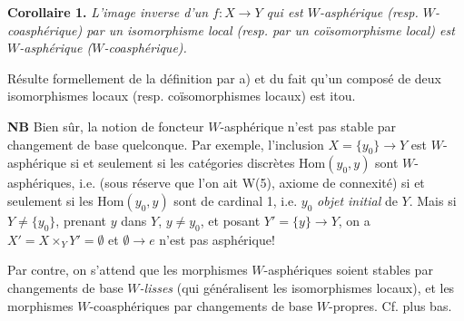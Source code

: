 \begin{center}
\end{center}

\textbf{Corollaire 1.} \textit{L'image inverse d'un $f : X \longrightarrow Y$ qui est $W$-asphérique (resp. $W$-coasphérique) par un isomorphisme local (resp. par un coïsomorphisme local) est $W$-asphérique ($W$-coasphérique).}

\begin{center}
\end{center}

Résulte formellement de la définition par a) et du fait qu'un composé de deux isomorphismes locaux (resp. coïsomorphismes locaux) est itou.

\textbf{NB} Bien sûr, la notion de foncteur $W$-asphérique n'est pas stable par changement de base quelconque. Par exemple, l'inclusion $X = \{y_0\} \longrightarrow Y$ est $W$-asphérique si et seulement si les catégories discrètes $\mathrm{Hom}(y_0, y)$ sont $W$-asphériques, i.e. (sous réserve que l'on ait W(5), axiome de connexité) si et seulement si les $\mathrm{Hom}(y_0, y)$ sont de cardinal 1, i.e. $y_0$ \textit{objet initial} de $Y$. Mais si $Y \neq \{y_0\}$, prenant $y$ dans $Y$, $y \neq y_0$, et posant $Y' = \{y\} \longrightarrow Y$, on a $X' = X \times_Y Y' = \emptyset$ et $\emptyset \longrightarrow e$ n'est pas asphérique!

Par contre, on s'attend que les morphismes $W$-asphériques soient stables par changements de base \textit{$W$-lisses} (qui généralisent les isomorphismes locaux), et les morphismes $W$-coasphériques par changements de base $W$-propres. Cf. plus bas.

